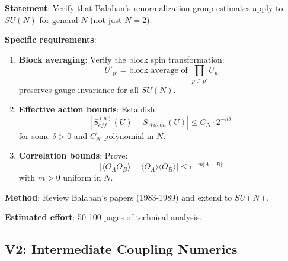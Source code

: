 \begin{verification}
\textbf{Statement}: Verify that Balaban's renormalization group estimates 
apply to $SU(N)$ for general $N$ (not just $N = 2$).

\textbf{Specific requirements}:
\begin{enumerate}
\item \textbf{Block averaging}: Verify the block spin transformation:
\begin{equation}
U'_{p'} = \text{block average of } \prod_{p \subset p'} U_p
\end{equation}
preserves gauge invariance for all $SU(N)$.

\item \textbf{Effective action bounds}: Establish:
\begin{equation}
|S_{eff}^{(n)}(U) - S_{Wilson}(U)| \leq C_N \cdot 2^{-n\delta}
\end{equation}
for some $\delta > 0$ and $C_N$ polynomial in $N$.

\item \textbf{Correlation bounds}: Prove:
\begin{equation}
|\langle O_A O_B \rangle - \langle O_A \rangle \langle O_B \rangle| \leq e^{-m|A-B|}
\end{equation}
with $m > 0$ uniform in $N$.
\end{enumerate}

\textbf{Method}: Review Balaban's papers (1983-1989) and extend to $SU(N)$.

\textbf{Estimated effort}: 50-100 pages of technical analysis.
\end{verification}

\subsection{V2: Intermediate Coupling Numerics}

